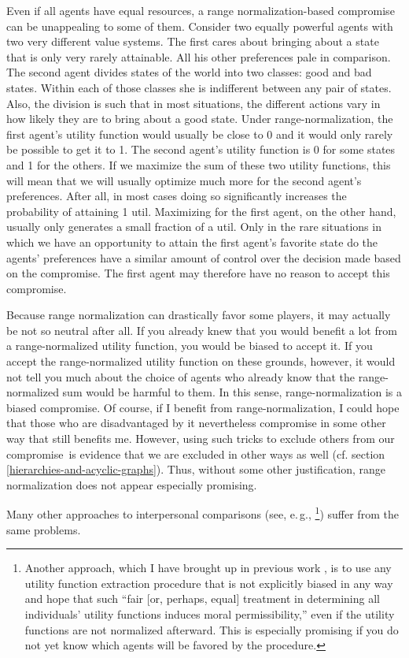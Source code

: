 Even if all agents have equal resources, a range normalization-based
compromise can be unappealing to some of them. Consider two equally
powerful agents with two very different value systems. The first cares
about bringing about a state that is only very rarely attainable. All
his other preferences pale in comparison. The second agent divides
states of the world into two classes: good and bad states. Within each
of those classes she is indifferent between any pair of states. Also,
the division is such that in most situations, the different actions vary
in how likely they are to bring about a good state. Under
range-normalization, the first agent's utility function would usually be
close to 0 and it would only rarely be possible to get it to 1. The
second agent's utility function is 0 for some states and 1 for the
others. If we maximize the sum of these two utility functions, this will
mean that we will usually optimize much more for the second agent's
preferences. After all, in most cases doing so significantly increases
the probability of attaining 1 util. Maximizing for the first agent, on
the other hand, usually only generates a small fraction of a util. Only
in the rare situations in which we have an opportunity to attain the
first agent's favorite state do the agents' preferences have a similar
amount of control over the decision made based on the compromise. The
first agent may therefore have no reason to accept this compromise.

Because range normalization can drastically favor some players, it may
actually be not so neutral after all. If you already knew that you would
benefit a lot from a range-normalized utility function, you would be
biased to accept it. If you accept the range-normalized utility function
on these grounds, however, it would not tell you much about the choice
of agents who already know that the range-normalized sum would be
harmful to them. In this sense, range-normalization is a biased
compromise. Of course, if I benefit from range-normalization, I could
hope that those who are disadvantaged by it nevertheless compromise in
some other way that still benefits me. However, using such tricks to
exclude others from our compromise~is evidence that we are excluded in
other ways as well (cf. section
\ref{hierarchies-and-acyclic-graphs}). Thus, without some other justification, range
normalization does not appear especially promising.

Many other approaches to interpersonal comparisons (see, e.\,g.,
\cite{Sen2014-ns}\footnote{Another approach, which I
  have brought up in previous work
  \citeyear{Oesterheld2016-pq}, is to use any utility
  function extraction procedure that is not explicitly biased in any way
  and hope that such ``fair {[}or, perhaps, equal{]} treatment in
  determining all individuals' utility functions induces moral
  permissibility,'' even if the utility functions are not normalized
  afterward. This is especially promising if you do not yet know which
  agents will be favored by the procedure.}) suffer from the same
problems.

